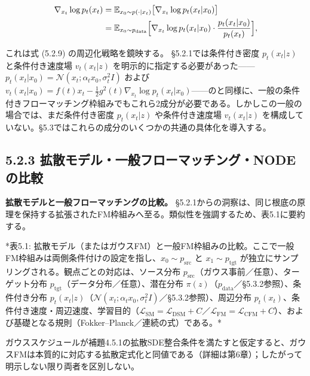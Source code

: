 \begin{align*}
\begin{aligned}
\nabla_{x_t}\log p_t(x_t)
&=\mathbb{E}_{x_0\sim p(\cdot|x_t)}\bigl[\nabla_{x_t}\log p_t(x_t|x_0)\bigr] \\
&=\mathbb{E}_{x_0\sim p_{\mathrm{data}}}\Bigl[\nabla_{x_t}\log p_t(x_t|x_0)\cdot\frac{p_t(x_t|x_0)}{p_t(x_t)}\Bigr],
\end{aligned}
\end{align*}


これは式 (5.2.9) の周辺化戦略を鏡映する。
§5.2.1では条件付き密度 $p_t(x_t|z)$ と条件付き速度場 $v_t(x_t|z)$ を明示的に指定する必要があった——$p_t(x_t|x_0)=\mathcal{N}(x_t;\alpha_t x_0,\sigma_t^2 I)$ および $v_t(x_t|x_0)=f(t)x_t-\frac{1}{2}g^2(t)\nabla_{x_t}\log p_t(x_t|x_0)$——のと同様に、一般の条件付きフローマッチング枠組みでもこれら2成分が必要である。しかしこの一般の場合では、まだ条件付き密度 $p_t(x_t|z)$ や条件付き速度場 $v_t(x_t|z)$ を構成していない。§5.3ではこれらの成分のいくつかの共通の具体化を導入する。

\subsection*{5.2.3 拡散モデル・一般フローマッチング・NODEの比較}


\textbf{拡散モデルと一般フローマッチングの比較。} §5.2.1からの洞察は、同じ根底の原理を保持する拡張されたFM枠組みへ至る。類似性を強調するため、表5.1に要約する。



*表5.1: 拡散モデル（またはガウスFM）と一般FM枠組みの比較。ここで一般FM枠組みは両側条件付けの設定を指し、$x_0\sim p_{\mathrm{src}}$ と $x_1\sim p_{\mathrm{tgt}}$ が独立にサンプリングされる。観点ごとの対応は、ソース分布 $p_{\mathrm{src}}$（ガウス事前／任意）、ターゲット分布 $p_{\mathrm{tgt}}$（データ分布／任意）、潜在分布 $\pi(z)$（$p_{\mathrm{data}}$／§5.3.2参照）、条件付き分布 $p_t(x_t|z)$（$\mathcal{N}(x_t;\alpha_t x_0,\sigma_t^2 I)$／§5.3.2参照）、周辺分布 $p_t(x_t)$、条件付き速度・周辺速度、学習目的（$\mathcal{L}_{\mathrm{SM}}=\mathcal{L}_{\mathrm{DSM}}+C$／$\mathcal{L}_{\mathrm{FM}}=\mathcal{L}_{\mathrm{CFM}}+C$）、および基礎となる規則（Fokker–Planck／連続の式）である。*

ガウススケジュールが補題4.5.1の拡散SDE整合条件を満たすと仮定すると、ガウスFMは本質的に対応する拡散定式化と同値である（詳細は第6章）；したがって明示しない限り両者を区別しない。

